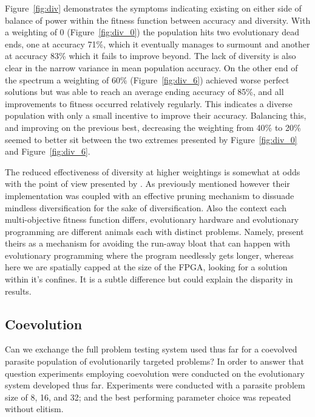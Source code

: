 Figure~\ref{fig:div} demonstrates the symptoms indicating existing on either side of
balance of power within the fitness function between accuracy and diversity. With a
weighting of 0 (Figure~\ref{fig:div_0}) the population hits two evolutionary dead ends,
one at accuracy 71\%, which it eventually manages to surmount and another at accuracy 83\%
which it fails to improve beyond. The lack of diversity is also clear in the narrow
variance in mean population accuracy. On the other end of the spectrum a weighting of
60\% (Figure~\ref{fig:div_6}) achieved worse perfect solutions but was able to reach
an average ending accuracy of 85\%, and all improvements to fitness occurred relatively
regularly. This indicates a diverse population with only a small incentive to improve
their accuracy. Balancing this, and improving on the previous best, decreasing the
weighting from 40\% to 20\% seemed to better sit between the two extremes presented
by Figure~\ref{fig:div_0} and Figure~\ref{fig:div_6}.

The reduced effectiveness of diversity at higher weightings is somewhat at odds with
the point of view presented by \cite{deJong:2001:RBP:2955239.2955241}. As previously mentioned
however their implementation was coupled with an effective pruning mechanism to dissuade
mindless diversification for the sake of diversification. Also the context each multi-objective
fitness function differs, evolutionary hardware and evolutionary programming are different
animals each with distinct problems. Namely, \cite{deJong:2001:RBP:2955239.2955241} present theirs as a mechanism
for avoiding the run-away bloat that can happen with evolutionary programming where
the program needlessly gets longer, whereas here we are spatially capped at the size of
the FPGA, looking for a solution within it's confines. It is a subtle difference but
could explain the disparity in results.

\subsection{Coevolution}

Can we exchange the full problem testing system used thus far for a coevolved
parasite population of evolutionarily targeted problems? In order to answer that
question experiments employing coevolution were conducted on the evolutionary
system developed thus far. Experiments were conducted with a parasite problem
size of 8, 16, and 32; and the best performing parameter choice was repeated
without elitism.

